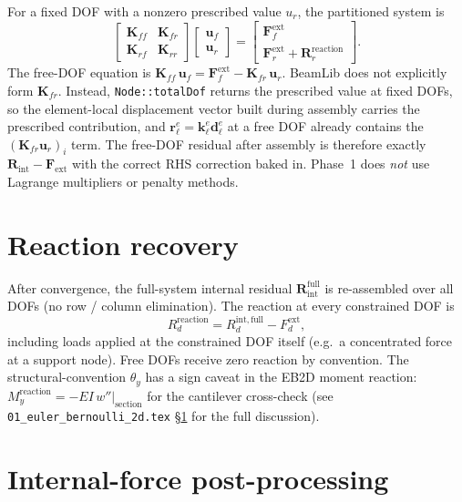\documentclass[11pt,a4paper]{book}
\newcommand{\bmath}[1]{\boldsymbol{#1}}
\begin{document}
For a fixed DOF with a nonzero prescribed value $u_r$, the partitioned system is
\[
\begin{bmatrix} \bmath{K}_{ff} & \bmath{K}_{fr} \\ \bmath{K}_{rf} & \bmath{K}_{rr} \end{bmatrix}
\begin{bmatrix} \bmath{u}_f \\ \bmath{u}_r \end{bmatrix}
=
\begin{bmatrix} \bmath{F}_f^{\mathrm{ext}} \\ \bmath{F}_r^{\mathrm{ext}} + \bmath{R}_r^{\mathrm{reaction}} \end{bmatrix}.
\]
The free-DOF equation is $\bmath{K}_{ff}\,\bmath{u}_f = \bmath{F}_f^{\mathrm{ext}} - \bmath{K}_{fr}\,\bmath{u}_r$. BeamLib does not explicitly form $\bmath{K}_{fr}$. Instead, \texttt{Node::totalDof} returns the prescribed value at fixed DOFs, so the element-local displacement vector built during assembly carries the prescribed contribution, and $\bmath{r}_\ell^e = \bmath{k}_\ell^e\bmath{d}_\ell^e$ at a free DOF already contains the $(\bmath{K}_{fr}\bmath{u}_r)_i$ term. The free-DOF residual after assembly is therefore exactly $\bmath{R}_{\mathrm{int}} - \bmath{F}_{\mathrm{ext}}$ with the correct RHS correction baked in. Phase~1 does \emph{not} use Lagrange multipliers or penalty methods.

\section{Reaction recovery}\label{sec:reactions}

After convergence, the full-system internal residual $\bmath{R}_{\mathrm{int}}^{\text{full}}$ is re-assembled over all DOFs (no row / column elimination). The reaction at every constrained DOF is
\[
R_d^{\mathrm{reaction}} = R_d^{\mathrm{int,full}} - F_d^{\mathrm{ext}},
\]
including loads applied at the constrained DOF itself (e.g.\ a concentrated force at a support node). Free DOFs receive zero reaction by convention. The structural-convention $\theta_y$ has a sign caveat in the EB2D moment reaction: $M_y^{\mathrm{reaction}} = -EI\,w''|_{\text{section}}$ for the cantilever cross-check (see \texttt{01\_euler\_bernoulli\_2d.tex} \S\ref{sec:reactions} for the full discussion).

\section{Internal-force post-processing}\label{sec:internal-forces}
\end{document}
